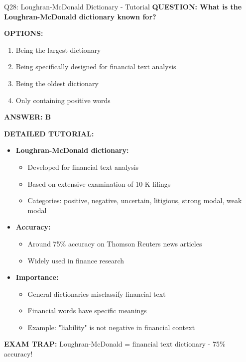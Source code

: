 \documentclass[8pt]{beamer}
\begin{document}
	\begin{frame}{Q28: Loughran-McDonald Dictionary - Tutorial}
		\fontsize{6.5}{7.5}\selectfont
		\textbf{QUESTION: What is the Loughran-McDonald dictionary known for?}
		
		\vspace{0.1cm}
		\textbf{OPTIONS:}
		\begin{enumerate}
			\item Being the largest dictionary
			\item Being specifically designed for financial text analysis
			\item Being the oldest dictionary
			\item Only containing positive words
		\end{enumerate}
		
		\vspace{0.1cm}
		\textcolor{myblue}{\textbf{ANSWER: B}}
		
		\vspace{0.1cm}
		\textbf{DETAILED TUTORIAL:}
		\begin{itemize}
			\item \textbf{Loughran-McDonald dictionary:}
			\begin{itemize}
				\item Developed for financial text analysis
				\item Based on extensive examination of 10-K filings
				\item Categories: positive, negative, uncertain, litigious, strong modal, weak modal
			\end{itemize}
			\item \textbf{Accuracy:}
			\begin{itemize}
				\item Around 75\% accuracy on Thomson Reuters news articles
				\item Widely used in finance research
			\end{itemize}
			\item \textbf{Importance:}
			\begin{itemize}
				\item General dictionaries misclassify financial text
				\item Financial words have specific meanings
				\item Example: "liability" is not negative in financial context
			\end{itemize}
		\end{itemize}
		
		\textcolor{myred}{\textbf{EXAM TRAP:}} Loughran-McDonald = \textcolor{myblue}{financial text dictionary} - 75\% accuracy!
	\end{frame}
	
\end{document}
